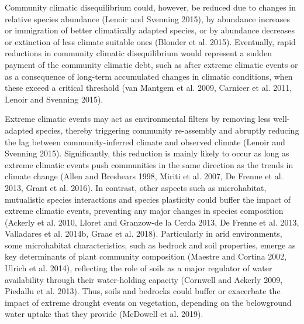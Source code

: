 \documentclass[11pt,twoside]{reedthesis}
\begin{document}
Community climatic disequilibrium could, however, be reduced due to
changes in relative species abundance (Lenoir and Svenning 2015), by
abundance increases or immigration of better climatically adapted
species, or by abundance decreases or extinction of less climate
suitable ones (Blonder et al. 2015). Eventually, rapid reductions in
community climatic disequilibrium would represent a sudden payment of
the community climatic debt, such as after extreme climatic events or as
a consequence of long-term accumulated changes in climatic conditions,
when these exceed a critical threshold (van Mantgem et al. 2009,
Carnicer et al. 2011, Lenoir and Svenning 2015).\par

Extreme climatic events may act as environmental filters by removing
less well-adapted species, thereby triggering community re-assembly and
abruptly reducing the lag between community-inferred climate and
observed climate (Lenoir and Svenning 2015). Significantly, this
reduction is mainly likely to occur as long as extreme climatic events
push communities in the same direction as the trends in climate change
(Allen and Breshears 1998, Miriti et al. 2007, De Frenne et al. 2013,
Grant et al. 2016). In contrast, other aspects such as microhabitat,
mutualistic species interactions and species plasticity could buffer the
impact of extreme climatic events, preventing any major changes in
species composition (Ackerly et al. 2010, Lloret and Granzow-de la Cerda
2013, De Frenne et al. 2013, Valladares et al. 2014b, Graae et al.
2018). Particularly in arid environments, some microhabitat
characteristics, such as bedrock and soil properties, emerge as key
determinants of plant community composition (Maestre and Cortina 2002,
Ulrich et al. 2014), reflecting the role of soils as a major regulator
of water availability through their water-holding capacity (Cornwell and
Ackerly 2009, Piedallu et al. 2013). Thus, soils and bedrocks could
buffer or exacerbate the impact of extreme drought events on vegetation,
depending on the belowground water uptake that they provide (McDowell et
al. 2019).\par
\end{document}
